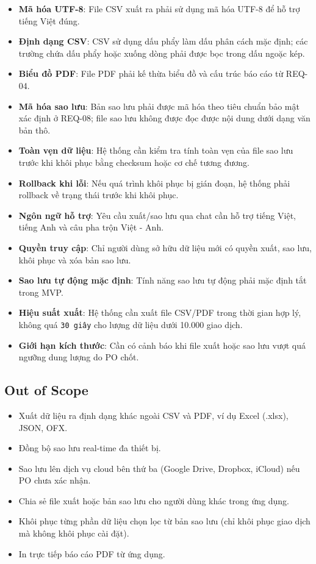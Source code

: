 \begin{itemize}
\item \textbf{Mã hóa UTF-8}: File CSV xuất ra phải sử dụng mã hóa UTF-8 để hỗ trợ tiếng Việt đúng.
\item \textbf{Định dạng CSV}: CSV sử dụng dấu phẩy làm dấu phân cách mặc định; các trường chứa dấu phẩy hoặc xuống dòng phải được bọc trong dấu ngoặc kép.
\item \textbf{Biểu đồ PDF}: File PDF phải kế thừa biểu đồ và cấu trúc báo cáo từ REQ-04.
\item \textbf{Mã hóa sao lưu}: Bản sao lưu phải được mã hóa theo tiêu chuẩn bảo mật xác định ở REQ-08; file sao lưu không được đọc được nội dung dưới dạng văn bản thô.
\item \textbf{Toàn vẹn dữ liệu}: Hệ thống cần kiểm tra tính toàn vẹn của file sao lưu trước khi khôi phục bằng checksum hoặc cơ chế tương đương.
\item \textbf{Rollback khi lỗi}: Nếu quá trình khôi phục bị gián đoạn, hệ thống phải rollback về trạng thái trước khi khôi phục.
\item \textbf{Ngôn ngữ hỗ trợ}: Yêu cầu xuất/sao lưu qua chat cần hỗ trợ tiếng Việt, tiếng Anh và câu pha trộn Việt - Anh.
\item \textbf{Quyền truy cập}: Chỉ người dùng sở hữu dữ liệu mới có quyền xuất, sao lưu, khôi phục và xóa bản sao lưu.
\item \textbf{Sao lưu tự động mặc định}: Tính năng sao lưu tự động phải mặc định tắt trong MVP.
\item \textbf{Hiệu suất xuất}: Hệ thống cần xuất file CSV/PDF trong thời gian hợp lý, không quá \texttt{30 giây} cho lượng dữ liệu dưới 10.000 giao dịch.
\item \textbf{Giới hạn kích thước}: Cần có cảnh báo khi file xuất hoặc sao lưu vượt quá ngưỡng dung lượng do PO chốt.
\end{itemize}
\subsection{Out of Scope}

\begin{itemize}
\item Xuất dữ liệu ra định dạng khác ngoài CSV và PDF, ví dụ Excel (.xlsx), JSON, OFX.
\item Đồng bộ sao lưu real-time đa thiết bị.
\item Sao lưu lên dịch vụ cloud bên thứ ba (Google Drive, Dropbox, iCloud) nếu PO chưa xác nhận.
\item Chia sẻ file xuất hoặc bản sao lưu cho người dùng khác trong ứng dụng.
\item Khôi phục từng phần dữ liệu chọn lọc từ bản sao lưu (chỉ khôi phục giao dịch mà không khôi phục cài đặt).
\item In trực tiếp báo cáo PDF từ ứng dụng.
\end{itemize}
